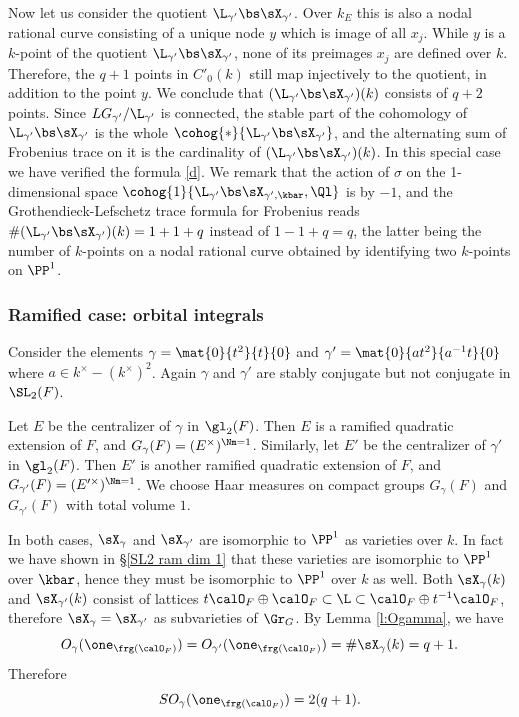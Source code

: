 Now let us consider the quotient $\L_{\gamma'}\bs\sX_{\gamma'}$. Over $k_{E}$ this is also a nodal rational curve consisting of a unique node $y$ which is image of all $x_{j}$. While $y$ is a $k$-point of the quotient $\L_{\gamma'}\bs\sX_{\gamma'}$, none of its preimages $x_{j}$ are defined over $k$. Therefore, the $q+1$ points in $C'_{0}(k)$ still map injectively to the quotient, in addition to the point $y$. We conclude that $(\L_{\gamma'}\bs\sX_{\gamma'})(k)$ consists of $q+2$ points.  Since $LG_{\gamma'}/\L_{\gamma'}$ is connected, the stable part of the cohomology of $\L_{\gamma'}\bs\sX_{\gamma'}$ is the whole $\cohog{*}{\L_{\gamma'}\bs\sX_{\gamma'}}$, and the alternating sum of Frobenius trace on it is the cardinality of $(\L_{\gamma'}\bs\sX_{\gamma'})(k)$. In this special case we have verified the formula \eqref{d}. We remark that the action of $\sigma$ on the 1-dimensional space $\cohog{1}{\L_{\gamma'}\bs\sX_{\gamma',\kbar},\Ql}$ is by $-1$, and the Grothendieck-Lefschetz trace formula for Frobenius reads $\#(\L_{\gamma'}\bs\sX_{\gamma'})(k)= 1+1+q$ instead of $1-1+q=q$, the latter being the number of $k$-points on a nodal rational curve obtained by identifying two $k$-points on $\PP^{1}$.


\subsubsection{Ramified case: orbital integrals}\label{sss:ram orb SL2} Consider the elements $\gamma=\mat{0}{t^{2}}{t}{0}$ and $\gamma'=\mat{0}{at^{2}}{a^{-1}t}{0}$ where $a\in k^{\times}-(k^{\times})^{2}$. Again $\gamma$ and $\gamma'$ are stably conjugate but not conjugate in $\SL_{2}(F)$. 

Let $E$ be the centralizer of $\gamma$ in $\gl_{2}(F)$. Then $E$ is a ramified quadratic extension of $F$, and $G_{\gamma}(F)=(E^{\times})^{\Nm=1}$. Similarly, let $E'$ be the centralizer of $\gamma'$ in $\gl_{2}(F)$. Then $E'$ is another ramified quadratic extension of $F$, and $G_{\gamma'}(F)=(E'^{\times})^{\Nm=1}$. We choose Haar measures on compact groups $G_{\gamma}(F)$ and $G_{\gamma'}(F)$ with total volume $1$.  

In both cases, $\sX_{\gamma}$ and $\sX_{\gamma'}$ are isomorphic to $\PP^{1}$ as varieties over $k$. In fact we have shown in \S\ref{SL2 ram dim 1} that these varieties are isomorphic to $\PP^{1}$ over $\kbar$, hence they must be isomorphic to $\PP^{1}$ over $k$ as well.  Both $\sX_{\gamma}(k)$ and $\sX_{\gamma'}(k)$  consist of lattices $t\calO_{F}\oplus\calO_{F}\subset \L\subset \calO_{F}\oplus t^{-1}\calO_{F}$, therefore $\sX_{\gamma}=\sX_{\gamma'}$ as subvarieties of $\Gr_{G}$. By Lemma \ref{l:Ogamma}, we have
\begin{equation*}
O_{\gamma}(\one_{\frg(\calO_{F})})=O_{\gamma'}(\one_{\frg(\calO_{F})})=\#\sX_{\gamma}(k)=q+1.
\end{equation*}
Therefore
\begin{equation}\label{ram so}
SO_{\gamma}(\one_{\frg(\calO_{F})})=2(q+1).
\end{equation}


